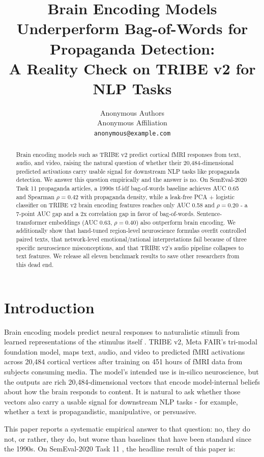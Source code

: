 \documentclass[11pt]{article}
\title{Brain Encoding Models Underperform Bag-of-Words for Propaganda Detection:\\
A Reality Check on TRIBE v2 for NLP Tasks}
\author{Anonymous Authors \\
  Anonymous Affiliation \\
  \texttt{anonymous@example.com}}
\begin{document}
\maketitle

\begin{abstract}
Brain encoding models such as TRIBE v2 predict cortical fMRI responses from text, audio, and video, raising the natural question of whether their 20{,}484-dimensional predicted activations carry usable signal for downstream NLP tasks like propaganda detection. We answer this question empirically and the answer is no. On SemEval-2020 Task 11 propaganda articles, a 1990s tf-idf bag-of-words baseline achieves AUC 0.65 and Spearman $\rho=0.42$ with propaganda density, while a leak-free PCA + logistic classifier on TRIBE v2 brain encoding features reaches only AUC 0.58 and $\rho=0.20$ - a 7-point AUC gap and a 2x correlation gap in favor of bag-of-words. Sentence-transformer embeddings (AUC 0.63, $\rho=0.40$) also outperform brain encoding. We additionally show that hand-tuned region-level neuroscience formulas overfit controlled paired texts, that network-level emotional/rational interpretations fail because of three specific neuroscience misconceptions, and that TRIBE v2's audio pipeline collapses to text features. We release all eleven benchmark results to save other researchers from this dead end.
\end{abstract}

\section{Introduction}

Brain encoding models predict neural responses to naturalistic stimuli from learned representations of the stimulus itself \cite{dascoli2026tribev2}. TRIBE v2, Meta FAIR's tri-modal foundation model, maps text, audio, and video to predicted fMRI activations across 20{,}484 cortical vertices after training on 451 hours of fMRI data from subjects consuming media. The model's intended use is in-silico neuroscience, but the outputs are rich 20{,}484-dimensional vectors that encode model-internal beliefs about how the brain responds to content. It is natural to ask whether those vectors also carry a usable signal for downstream NLP tasks - for example, whether a text is propagandistic, manipulative, or persuasive.

This paper reports a systematic empirical answer to that question: no, they do not, or rather, they do, but worse than baselines that have been standard since the 1990s. On SemEval-2020 Task 11 \cite{dasanmartino2020semeval}, the headline result of this paper is:
\end{document}
